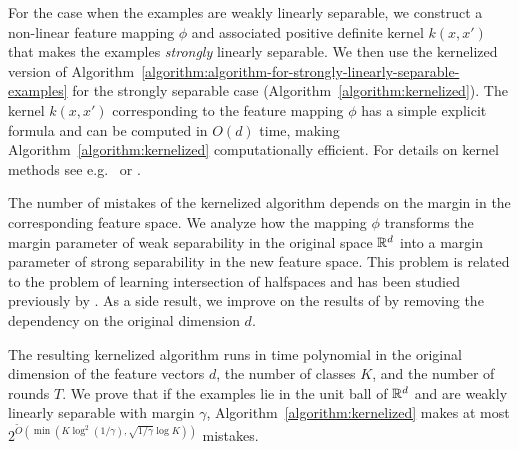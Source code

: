 For the case when the examples are weakly linearly separable, we construct a
non-linear feature mapping $\phi$ and associated positive definite kernel
$k(x,x')$ that makes the examples \emph{strongly} linearly separable. We then
use the kernelized version of
Algorithm~\ref{algorithm:algorithm-for-strongly-linearly-separable-examples} for
the strongly separable case (Algorithm~\ref{algorithm:kernelized}). The kernel
$k(x,x')$ corresponding to the feature mapping $\phi$ has a simple explicit
formula and can be computed in $O(d)$ time, making
Algorithm~\ref{algorithm:kernelized} computationally efficient. For details on
kernel methods see e.g.~\citet{Scholkopf-Smola-2002} or
\citet{Shawe-Taylor-Cristianini-2004}.

The number of mistakes of the kernelized algorithm depends on the margin in the
corresponding feature space. We analyze how the mapping $\phi$ transforms the
margin parameter of weak separability in the original space $\mathbb{R}^d$ into a margin
parameter of strong separability in the new feature space. This problem is
related to the problem of learning intersection of halfspaces and has been
studied previously by \citet{Klivans-Servedio-2008}. As a side result, we
improve on the results of \citet{Klivans-Servedio-2008} by removing the
dependency on the original dimension $d$.

The resulting kernelized algorithm runs in time polynomial in the
original dimension of the feature vectors $d$, the number of classes $K$, and
the number of rounds $T$. We prove that if the examples lie in the unit ball of
$\mathbb{R}^d$ and are weakly linearly separable with margin $\gamma$,
Algorithm~\ref{algorithm:kernelized} makes at
most $2^{\widetilde{O}(\min(K \log^2 (1/\gamma), \sqrt{1/\gamma}
\log K))}$ mistakes.
